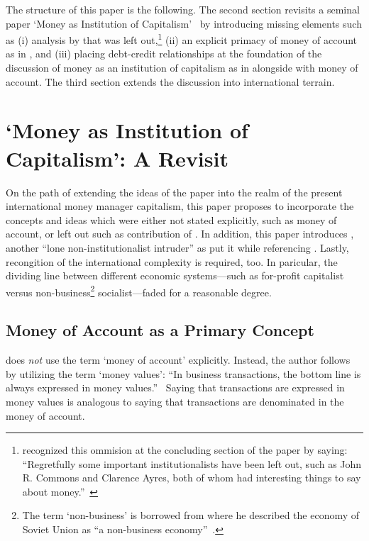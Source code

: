 The structure of this paper is the following. The second section revisits a seminal paper `Money as Institution of Capitalism'~\cite{dillard1987} by introducing missing elements such as (i) analysis by \cite{commons1936} that was left out,\footnote{\citeauthor{dillard1987} recognized this ommision at the concluding section of the paper by saying: ``Regretfully some important institutionalists have been left out, such as John R. Commons and Clarence Ayres, both of whom had interesting things to say about money.''~\citep[p.~1644]{dillard1987}} (ii) an explicit primacy of money of account as in \cite{keynes1930a}, and (iii) placing debt-credit relationships at the foundation of the discussion of money as an institution of capitalism as in \cite{innes1913} alongside with money of account. The third section extends the discussion into international terrain.

\section{\cite{dillard1987} `Money as Institution of Capitalism': A Revisit}

On the path of extending the ideas of the \cite{dillard1987} paper into the realm of the present international money manager capitalism, this paper proposes to incorporate the concepts and ideas which were either not stated explicitly, such as money of account, or left out such as contribution of \citeauthor{commons1923}. In addition, this paper introduces \citeauthor{innes1913}, another ``lone non-institutionalist intruder'' as \citeauthor{dillard1987} put it while referencing \citeauthor{keynes1930a}. Lastly, recongition of the international complexity is required, too. In paricular, the dividing line between different economic systems---such as for-profit capitalist versus non-business\footnote{The term `non-business' is borrowed from \cite{dillard1967} where he described the economy of Soviet Union as ``a non-business economy''~\cite[p.~633]{dillard1967}.} socialist---faded for a reasonable degree. 

\subsection{Money of Account as a Primary Concept}

\cite{dillard1987} does \textit{not} use the term `money of account' explicitly. Instead, the author follows \cite{veblen1904} by utilizing the term `money values': ``In business transactions, the bottom line is always expressed in money values.''~\citep[p.~1628]{dillard1987} Saying that transactions are expressed in money values is analogous to saying that transactions are denominated in the money of account.

